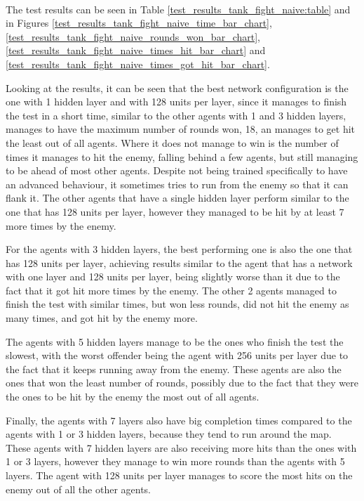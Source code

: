 \paragraph{}
The test results can be seen in Table \ref{test_results_tank_fight_naive:table} and in Figures \ref{test_results_tank_fight_naive_time_bar_chart}, \ref{test_results_tank_fight_naive_rounds_won_bar_chart}, \ref{test_results_tank_fight_naive_times_hit_bar_chart} and \ref{test_results_tank_fight_naive_times_got_hit_bar_chart}.

Looking at the results, it can be seen that the best network configuration is the one with 1 hidden layer and with 128 units per layer, since it manages to finish the test in a short time, similar to the other agents with 1 and 3 hidden layers, manages to have the maximum number of rounds won, 18, an manages to get hit the least out of all agents. Where it does not manage to win is the number of times it manages to hit the enemy, falling behind a few agents, but still managing to be ahead of most other agents. Despite not being trained specifically to have an advanced behaviour, it sometimes tries to run from the enemy so that it can flank it. The other agents that have a single hidden layer perform similar to the one that has 128 units per layer, however they managed to be hit by at least 7 more times by the enemy.

For the agents with 3 hidden layers, the best performing one is also the one that has 128 units per layer, achieving results similar to the agent that has a network with one layer and 128 units per layer, being slightly worse than it due to the fact that it got hit more times by the enemy. The other 2 agents managed to finish the test with similar times, but won less rounds, did not hit the enemy as many times, and got hit by the enemy more.

The agents with 5 hidden layers manage to be the ones who finish the test the slowest, with the worst offender being the agent with 256 units per layer due to the fact that it keeps running away from the enemy. These agents are also the ones that won the least number of rounds, possibly due to the fact that they were the ones to be hit by the enemy the most out of all agents.

Finally, the agents with 7 layers also have big completion times compared to the agents with 1 or 3 hidden layers, because they tend to run around the map. These agents with 7 hidden layers are also receiving more hits than the ones with 1 or 3 layers, however they manage to win more rounds than the agents with 5 layers. The agent with 128 units per layer manages to score the most hits on the enemy out of all the other agents.

